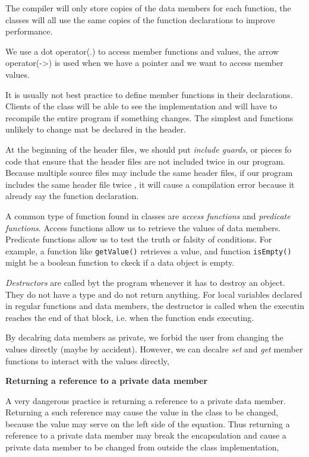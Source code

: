 \documentclass{article}
\begin{document}
The compiler will only store copies of the data members for each function, the classes will all use the same 
copies of the function declarations to improve performance.

We use a dot operator(.) to access member functions and values, the arrow operator(->) is used when we have a
pointer and we want to access member values.

It is usually not best practice to define member functions in their declarations.  Clients of the class
will be able to see the implementation and will have to recompile the entire program if something changes.
The simplest and functions unlikely to change mat be declared in the header. 

At the beginning of the header files, we should put \textit{include guards}, or pieces fo code that ensure that
the header files are not included twice in our program. Because multiple source files may include the same 
header files, if our program includes the same header file twice , it will cause a compilation error because
it already say the function declaration.

A common type of function found in classes are \textit{access functions} and \textit{predicate functions}. 
Access functions allow us to retrieve the values of data members. Predicate functions allow us to test the 
truth or falsity of conditions. For example, a function like \texttt{getValue()} retrieves a value, and function
\texttt{isEmpty()} might be a boolean function to ckeck if a data object is empty.

\textit{Destructors} are called byt the program whenever it has to destroy an object. They do not have a type 
and do not return anything. For local variables declared in regular functions and data members, the destructor
is called when the executin reaches the end of that block, i.e. when the function ends executing. 

By decalring data members as private, we forbid the user from changing the values directly (maybe by accident).
However, we can decalre \textit{set} and \textit{get} member functions to interact with the values 
directly, 

\hspace{10mm}\textbf{Returning a reference to a private data member}

A very dangerous practice is returning a reference to a private data member. Returning a such reference may cause
the value in the class to be changed, because the value may serve on the left side of the equation. Thus returning
a reference to a private data member  may break the encapsulation and cause a private data member to be changed
from outside the class implementation,
\end{document}
